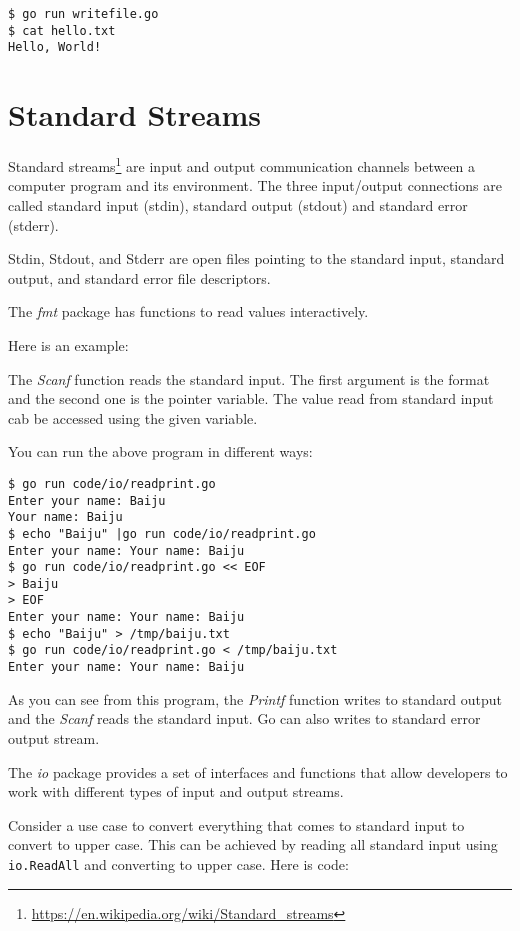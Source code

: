 \begin{lstlisting}[numbers=none]
$ go run writefile.go
$ cat hello.txt
Hello, World!
\end{lstlisting}

\section{Standard Streams}

Standard streams\footnote{\url{https://en.wikipedia.org/wiki/Standard_streams}}
are input and output communication channels between a computer program and its
environment. The three input/output connections are called standard input
(stdin), standard output (stdout) and standard error (stderr).

Stdin, Stdout, and Stderr are open files pointing to the standard input,
standard output, and standard error file descriptors.

The \textit{fmt} package has functions to read values
interactively.

Here is an example:



The \textit{Scanf} function reads the standard input. The first argument is the
format and the second one is the pointer variable. The value read from standard
input cab be accessed using the given variable.

You can run the above program in different ways:

\begin{lstlisting}[numbers=none]
$ go run code/io/readprint.go
Enter your name: Baiju
Your name: Baiju
$ echo "Baiju" |go run code/io/readprint.go
Enter your name: Your name: Baiju
$ go run code/io/readprint.go << EOF
> Baiju
> EOF
Enter your name: Your name: Baiju
$ echo "Baiju" > /tmp/baiju.txt
$ go run code/io/readprint.go < /tmp/baiju.txt
Enter your name: Your name: Baiju
\end{lstlisting}

As you can see from this program, the \textit{Printf} function writes to
standard output and the \textit{Scanf} reads the standard input. Go can also
writes to standard error output stream.

The \textit{io} package provides a set of interfaces and functions that allow
developers to work with different types of input and output streams.

Consider a use case to convert everything that comes to standard input to
convert to upper case. This can be achieved by reading all standard input
using \texttt{io.ReadAll} and converting to upper case.  Here is code:

